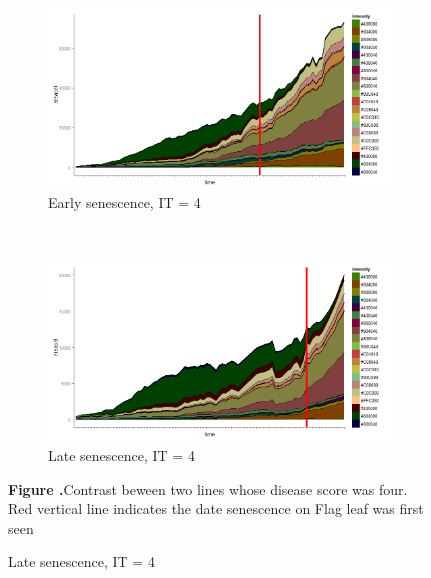 \documentclass{frontiersSCNS} %
\begin{document}
\begin{figure}
    \begin{center}
    \begin{subfigure}[b]{0.5\textwidth}
        \includegraphics[width=\textwidth]{fig2a.png}
        \caption{Early senescence, IT = 4}
    \end{subfigure}
    ~ %
    \begin{subfigure}[b]{0.5\textwidth}
        \includegraphics[width=\textwidth]{fig2b.png}
        \caption{Late senescence, IT = 4}
    \end{subfigure}
\end{center}
\textbf{\label{fig:02} Figure .}{Contrast beween two lines whose disease score was four. Red vertical line indicates the date senescence on Flag leaf was first seen}
\end{figure}


\end{document}
